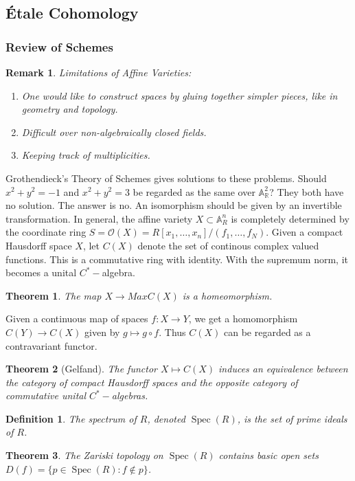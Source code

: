 \documentclass[oneside]{book}
\theoremstyle{mystyle}
\newtheorem{theorem}{Theorem}[section]
\newtheorem{definition}{Definition}[section]
\newtheorem{remark}{Remark}[section]
\DeclareMathOperator{\Spec}{Spec}
\begin{document}
\subsection{\'{E}tale Cohomology}
\subsubsection{Review of Schemes}
\begin{remark}
Limitations of Affine Varieties:
\begin{enumerate}
    \item One would like to construct spaces by gluing together simpler pieces, like in geometry and topology.
    \item Difficult over non-algebraically closed fields.
    \item Keeping track of multiplicities.
\end{enumerate}
\end{remark}
Grothendieck's Theory of Schemes gives solutions to these problems. Should $x^2+y^2 = -1$ and $x^2+y^2 = 3$ be regarded as the same over $\mathbb{A}_{\mathbb{R}}^2$? They both have no solution. The answer is no. An isomorphism should be given by an invertible transformation. In general, the affine variety $X\subset \mathbb{A}_{R}^n$ is completely determined by the coordinate ring $S = \mathcal{O}(X) = R[x_1,\hdots, x_n]/(f_1,\hdots, f_N)$. Given a compact Hausdorff space $X$, let $C(X)$ denote the set of continous complex valued functions. This is a commutative ring with identity. With the supremum norm, it becomes a unital $C^{*}-$algebra.
\begin{theorem}
The map $X\rightarrow MaxC(X)$ is a homeomorphism.
\end{theorem}
Given a continuous map of spaces $f:X\rightarrow Y$, we get a homomorphism $C(Y)\rightarrow C(X)$ given by $g\mapsto g\circ f$. Thus $C(X)$ can be regarded as a contravariant functor. 
\begin{theorem}[Gelfand]
The functor $X\mapsto C(X)$ induces an equivalence between the category of compact Hausdorff spaces and the opposite category of commutative unital $C^{*}-$algebras.
\end{theorem}
\begin{definition}
The spectrum of $R$, denoted $\Spec(R)$, is the set of prime ideals of $R$.
\end{definition}
\begin{theorem}
The Zariski topology on $\Spec(R)$ contains basic open sets $D(f) = \{p\in \Spec(R): f\notin p\}$.
\end{theorem}
\end{document}
